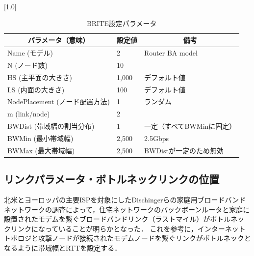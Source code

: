 \documentclass[Japanese]{dicomopapers}
\begin{document}
\begin{table}[htbp]
    \caption{BRITE設定パラメータ}
    \label{tab:brite-param}
    \begin{center}
        \scalebox{0.80}[1.0]{
            \begin{tabular}{lll}
                \hline
                \multicolumn{1}{c}{パラメータ（意味）} & \multicolumn{1}{c}{設定値} & \multicolumn{1}{c}{備考} \\ \hline
                Name (モデル)                    & 2                       & Router BA model        \\
                N (ノード数)                      & 10                      &                        \\
                HS (主平面の大きさ)                  & 1,000                   & デフォルト値                 \\
                LS (内面の大きさ)                   & 100                     & デフォルト値                 \\
                NodePlacement (ノード配置方法)       & 1                       & ランダム                   \\
                m (link/node)                 & 2                       &                        \\
                BWDist (帯域幅の割当分布)             & 1                       & 一定（すべてBWMinに固定）        \\
                BWMin (最小帯域幅)                 & 2,500                   & 2.5Gbps                \\
                BWMax (最大帯域幅)                 & 2,500                   & BWDistが一定のため無効         \\ \hline
            \end{tabular}
        }
    \end{center}
\end{table}

\subsection{リンクパラメータ・ボトルネックリンクの位置}
北米とヨーロッパの主要ISPを対象にしたDischingerらの家庭用ブロードバンドネットワークの調査によって，住宅ネットワークのバックボーンルータと家庭に設置されたモデムを繋ぐブロードバンドリンク（ラストマイル）がボトルネックリンクになっていることが明らかとなった\cite{broadband-characterizing}．
これを参考に，インターネットトポロジと攻撃ノードが接続されたモデムノードを繋ぐリンクがボトルネックとなるように帯域幅とRTTを設定する．
\end{document}
